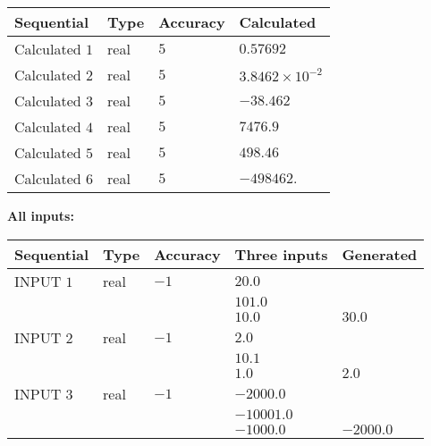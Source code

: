 \documentclass[12pt]{article}
\begin{document}
   
   
   
\noindent{}
   
   
  
  
\noindent\begin{tabular}{|l|l|l|l|}
\hline
 Sequential & Type & Accuracy & Calculated \\ 
\hline
 
 
  Calculated $            1 $ & real & $            5  $ & 
 $ 0.57692 $ 
 \\  \hline  
 
 
  Calculated $            2 $ & real & $            5  $ & 
 $ 3.8462 \times 10^{-2} $ 
 \\  \hline  
 
 
  Calculated $            3 $ & real & $            5  $ & 
 $ -38.462 $ 
 \\  \hline  
 
 
  Calculated $            4 $ & real & $            5  $ & 
 $ 7476.9 $ 
 \\  \hline  
 
 
  Calculated $            5 $ & real & $            5  $ & 
 $ 498.46 $ 
 \\  \hline  
 
 
  Calculated $            6 $ & real & $            5  $ & 
 $ -498462. $ 
 \\  \hline  
 \end{tabular}
   
   
   
   
\noindent\vspace{0.1in}\hspace{-0.08in} {\textbf{\Large{All inputs: }}}
   
   
  
  
\noindent\begin{tabular}{|l|l|l|l|l|}
\hline
 Sequential & Type & Accuracy & Three inputs & Generated \\ 
\hline
 
 
  INPUT $            1 $ & real & $           -1  $ & $
 20.0
  $ & \\
  & & &  $
 101.0
  $ & \\
  & & &  $
 10.0
 $ & $ 30.0 $ 
 \\  \hline  
 
 
  INPUT $            2 $ & real & $           -1  $ & $
 2.0
  $ & \\
  & & &  $
 10.1
  $ & \\
  & & &  $
 1.0
 $ & $ 2.0 $ 
 \\  \hline  
 
 
  INPUT $            3 $ & real & $           -1  $ & $
 -2000.0
  $ & \\
  & & &  $
 -10001.0
  $ & \\
  & & &  $
 -1000.0
 $ & $ -2000.0 $ 
 \\  \hline  
 \end{tabular}
   
\end{document}
